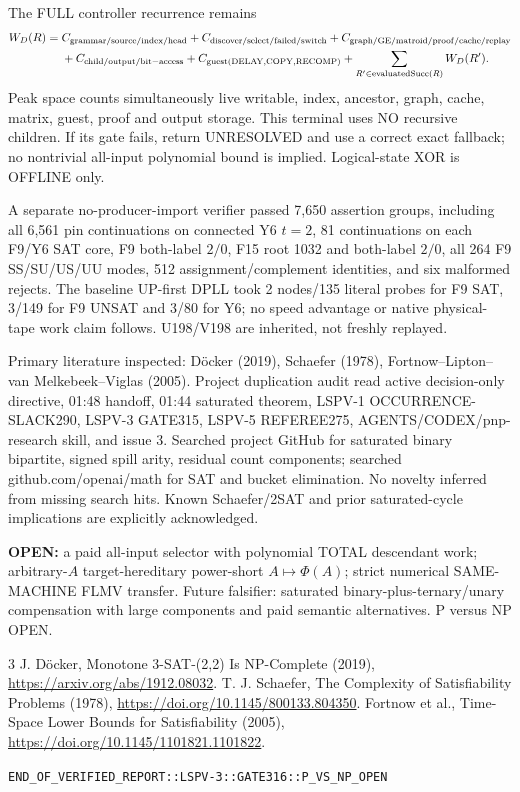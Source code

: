 \documentclass[11pt]{article}
\begin{document}
The FULL controller recurrence remains
\[
\begin{split}
W_D(R)={}&C_{\rm grammar/source/index/head}+C_{\rm discover/select/failed/switch}
+C_{\rm graph/GE/matroid/proof/cache/replay}\\
&+C_{\rm child/output/bit-access}+C_{\rm guest(DELAY,COPY,RECOMP)}
+\sum_{R'\in\mathrm{evaluatedSucc}(R)}W_D(R').
\end{split}
\]
Peak space counts simultaneously live writable, index, ancestor, graph, cache, matrix, guest, proof and output storage. This terminal uses NO recursive children. If its gate fails, return UNRESOLVED and use a correct exact fallback; no nontrivial all-input polynomial bound is implied. Logical-state XOR is OFFLINE only.

A separate no-producer-import verifier passed 7,650 assertion groups, including all 6,561 pin continuations on connected Y6 $t=2$, 81 continuations on each F9/Y6 SAT core, F9 both-label $2/0$, F15 root 1032 and both-label $2/0$, all 264 F9 SS/SU/US/UU modes, 512 assignment/complement identities, and six malformed rejects. The baseline UP-first DPLL took 2 nodes/135 literal probes for F9 SAT, 3/149 for F9 UNSAT and 3/80 for Y6; no speed advantage or native physical-tape work claim follows. U198/V198 are inherited, not freshly replayed.

Primary literature inspected: D\"ocker (2019), Schaefer (1978), Fortnow--Lipton--van Melkebeek--Viglas (2005). Project duplication audit read active decision-only directive, 01:48 handoff, 01:44 saturated theorem, LSPV-1 OCCURRENCE-SLACK290, LSPV-3 GATE315, LSPV-5 REFEREE275, AGENTS/CODEX/pnp-research skill, and issue 3. Searched project GitHub for saturated binary bipartite, signed spill arity, residual count components; searched github.com/openai/math for SAT and bucket elimination. No novelty inferred from missing search hits. Known Schaefer/2SAT and prior saturated-cycle implications are explicitly acknowledged.

\noindent\textbf{OPEN:} a paid all-input selector with polynomial TOTAL descendant work; arbitrary-$A$ target-hereditary power-short $A\mapsto\Phi(A)$; strict numerical SAME-MACHINE FLMV transfer. Future falsifier: saturated binary-plus-ternary/unary compensation with large components and paid semantic alternatives. P versus NP OPEN.
\begin{thebibliography}{3}
 J. D\"ocker, Monotone 3-SAT-(2,2) Is NP-Complete (2019), \url{https://arxiv.org/abs/1912.08032}.
 T. J. Schaefer, The Complexity of Satisfiability Problems (1978), \url{https://doi.org/10.1145/800133.804350}.
 Fortnow et al., Time-Space Lower Bounds for Satisfiability (2005), \url{https://doi.org/10.1145/1101821.1101822}.
\end{thebibliography}
\noindent\texttt{END\_OF\_VERIFIED\_REPORT::LSPV-3::GATE316::P\_VS\_NP\_OPEN}
\end{document}
